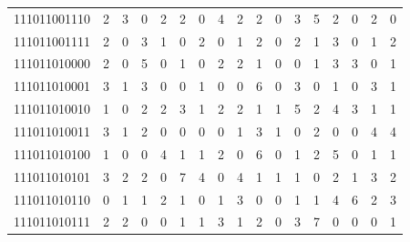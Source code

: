 \documentclass[10pt,a4paper]{article}
\begin{document}
\begin{longtable}{ |c|c|c|c|c|c|c|c|c|c|c|c|c|c|c|c|c| }
    111011001110              & 2                            & 3                                & 0                            & 2                              & 2   & 0   & 4   & 2   & 2   & 0   & 3   & 5   & 2   & 0   & 2   & 0   \\
    111011001111              & 2                            & 0                                & 3                            & 1                              & 0   & 2   & 0   & 1   & 2   & 0   & 2   & 1   & 3   & 0   & 1   & 2   \\
    111011010000              & 2                            & 0                                & 5                            & 0                              & 1   & 0   & 2   & 2   & 1   & 0   & 0   & 1   & 3   & 3   & 0   & 1   \\
    111011010001              & 3                            & 1                                & 3                            & 0                              & 0   & 1   & 0   & 0   & 6   & 0   & 3   & 0   & 1   & 0   & 3   & 1   \\
    111011010010              & 1                            & 0                                & 2                            & 2                              & 3   & 1   & 2   & 2   & 1   & 1   & 5   & 2   & 4   & 3   & 1   & 1   \\
    111011010011              & 3                            & 1                                & 2                            & 0                              & 0   & 0   & 0   & 1   & 3   & 1   & 0   & 2   & 0   & 0   & 4   & 4   \\
    111011010100              & 1                            & 0                                & 0                            & 4                              & 1   & 1   & 2   & 0   & 6   & 0   & 1   & 2   & 5   & 0   & 1   & 1   \\
    111011010101              & 3                            & 2                                & 2                            & 0                              & 7   & 4   & 0   & 4   & 1   & 1   & 1   & 0   & 2   & 1   & 3   & 2   \\
    111011010110              & 0                            & 1                                & 1                            & 2                              & 1   & 0   & 1   & 3   & 0   & 0   & 1   & 1   & 4   & 6   & 2   & 3   \\
    111011010111              & 2                            & 2                                & 0                            & 0                              & 1   & 1   & 3   & 1   & 2   & 0   & 3   & 7   & 0   & 0   & 0   & 1   \\

\end{longtable}
\end{document}
